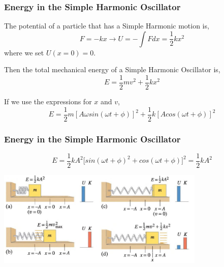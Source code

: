 \documentclass[]{beamer}
\begin{document}

\begin{frame}
\frametitle{Energy in the Simple Harmonic Oscillator}

The potential of a particle that has a Simple Harmonic motion is,
\pause
\begin{equation}
F=-kx\rightarrow U=-\int Fdx=\frac{1}{2}kx^2
\end{equation}
\pause
where we set $U(x=0)=0$.
\vspace{3mm}
\pause

Then the total mechanical energy of a  Simple Harmonic Oscillator is,
\pause
\begin{equation}
E=\frac{1}{2}mv^2+\frac{1}{2}kx^2
\end{equation}

\pause
If we use the expressions for $x$ and $v$,
\pause
\begin{equation}
E=\frac{1}{2}m{[A\omega sin(\omega t +\phi)]}^2+\frac{1}{2}k{[Acos(\omega t +\phi)]}^2
\end{equation}

\end{frame}




\begin{frame}
\frametitle{Energy in the Simple Harmonic Oscillator}



\begin{equation}
E=\frac{1}{2}kA^2{[ sin(\omega t +\phi)}^2+{cos(\omega t +\phi)]}^2=\frac{1}{2}kA^2
\end{equation}

\vspace{5mm}
\pause
    \begin{center}
  \includegraphics[height=1.8in]{images3/energy1.jpg}
\end{center}
\end{frame}
\end{document}

